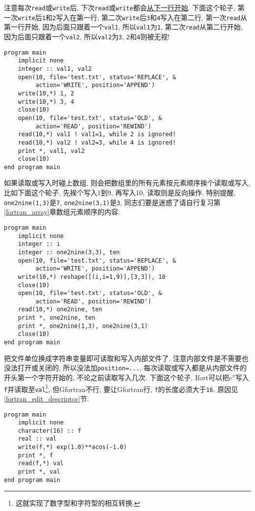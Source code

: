注意每次\texttt{read}或\texttt{write}后, 下次\texttt{read}或\texttt{write}都会\uline{从下一行开始}. 下面这个轮子, 第一次\texttt{write}后\texttt{1}和\texttt{2}写入在第一行, 第二次\texttt{write}后\texttt{3}和\texttt{4}写入在第二行, 第一次\texttt{read}从第一行开始, 因为后面只跟着一个\texttt{val1}, 所以\texttt{val1}为\texttt{1}, 第二次\texttt{read}从第二行开始, 因为后面只跟着一个\texttt{val2}, 所以\texttt{val2}为\texttt{3}, \texttt{2}和\texttt{4}则被无视!
\begin{lstlisting}
program main
    implicit none
    integer :: val1, val2
    open(10, file='test.txt', status='REPLACE', &
         action='WRITE', position='APPEND')
    write(10,*) 1, 2
    write(10,*) 3, 4
    close(10)
    open(10, file='test.txt', status='OLD', &
         action='READ', position='REWIND')
    read(10,*) val1 ! val1=1, while 2 is ignored!
    read(10,*) val2 ! val2=3, while 4 is ignored!
    print *, val1, val2
    close(10)
end program main
\end{lstlisting}

如果读取或写入时碰上数组, 则会把数组里的所有元素按元素顺序挨个读取或写入, 比如下面这个轮子, 先挨个写入1到9, 再写入10, 读取则是反向操作. 特别提醒, \texttt{one2nine(1,3)}是\texttt{7}, \texttt{one2nine(3,1)}是\texttt{3}, 同志们要是迷惑了请自行复习第\ref{fortran_array}章数组元素顺序的内容.
\begin{lstlisting}
program main
    implicit none
    integer :: i
    integer :: one2nine(3,3), ten
    open(10, file='test.txt', status='REPLACE', &
         action='WRITE', position='APPEND')
    write(10,*) reshape([(i,i=1,9)],[3,3]), 10
    close(10)
    open(10, file='test.txt', status='OLD', &
         action='READ', position='REWIND')
    read(10,*) one2nine, ten
    print *, one2nine, ten
    print *, one2nine(1,3), one2nine(3,1)
    close(10)
end program main
\end{lstlisting}

把文件单位换成字符串变量即可读取和写入内部文件了. 注意内部文件是不需要也没法打开或关闭的, 所以没法加\texttt{position=...}, 每次读取或写入都是从内部文件的开头第一个字符开始的, 不论之前读取写入几次. 下面这个轮子, Ifort可以把$e^\pi$写入\texttt{f}并读取至\texttt{val}\footnote{这就实现了数字型和字符型的相互转换.}, 但Gfortran不行, 要让Gfortran行, \texttt{f}的长度必须大于\texttt{16}. 原因见\ref{fortran_edit_descriptor}节.\label{internal_file}
\begin{lstlisting}
program main
    implicit none
    character(16) :: f
    real :: val
    write(f,*) exp(1.0)**acos(-1.0)
    print *, f
    read(f,*) val
    print *, val
end program main
\end{lstlisting}

